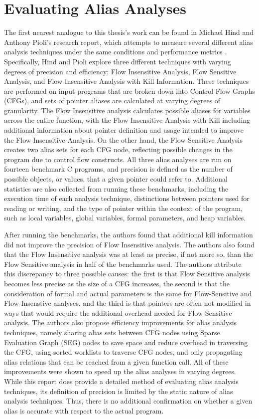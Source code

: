 \section{Evaluating Alias Analyses}
The first nearest analogue to this thesis's work can be found in Michael Hind and Anthony Pioli's research report, which attempts to measure several different alias analysis techniques under the same conditions and performance metrics \cite{Hind_old}. Specifically, Hind and Pioli explore three different techniques with varying degrees of precision and efficiency: Flow Insensitive Analysis, Flow Sensitive Analysis, and Flow Insensitive Analysis with Kill Information. These techniques are performed on input programs that are broken down into Control Flow Graphs (CFGs), and sets of pointer aliases are calculated at varying degrees of granularity. The Flow Insensitive analysis calculates possible aliases for variables across the entire function, with the Flow Insensitive Analysis with Kill including additional information about pointer definition and usage intended to improve the Flow Insensitive Analysis. On the other hand, the Flow Sensitive Analysis creates two alias sets for each CFG node, reflecting possible changes in the program due to control flow constructs. All three alias analyses are run on fourteen benchmark C programs, and precision is defined as the number of possible objects, or values, that a given pointer could refer to. Additional statistics are also collected from running these benchmarks, including the execution time of each analysis technique, distinctions between pointers used for reading or writing, and the type of pointer within the context of the program, such as local variables, global variables, formal parameters, and heap variables.

After running the benchmarks, the authors found that additional kill information did not improve the precision of Flow Insensitive analysis. The authors also found that the Flow Insensitive analysis was at least as precise, if not more so, than the Flow Sensitive analysis in half of the benchmarks used. The authors attribute this discrepancy to three possible causes: the first is that Flow Sensitive analysis becomes less precise as the size of a CFG increases, the second is that the consideration of formal and actual parameters is the same for Flow-Sensitive and Flow-Insenstive analyses, and the third is that pointers are often not modified in ways that would require the additional overhead needed for Flow-Sensitive analysis. The authors also propose efficiency improvements for alias analysis techniques, namely sharing alias sets between CFG nodes using Sparse Evaluation Graph (SEG) nodes to save space and reduce overhead in traversing the CFG, using sorted worklists to traverse CFG nodes, and only propagating alias relations that can be reached from a given function call. All of these improvements were shown to speed up the alias analyses in varying degrees. While this report does provide a detailed method of evaluating alias analysis techniques, its definition of precision is limited by the static nature of alias analysis techniques. Thus, there is no additional confirmation on whether a given alias is accurate with respect to the actual program.


